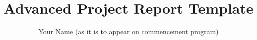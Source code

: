 \title{Advanced Project Report Template}
\author{Your Name (as it is to appear on commencement program)}
\newcommand{\supervisor}{Your project supervisor's name}
\date{}

